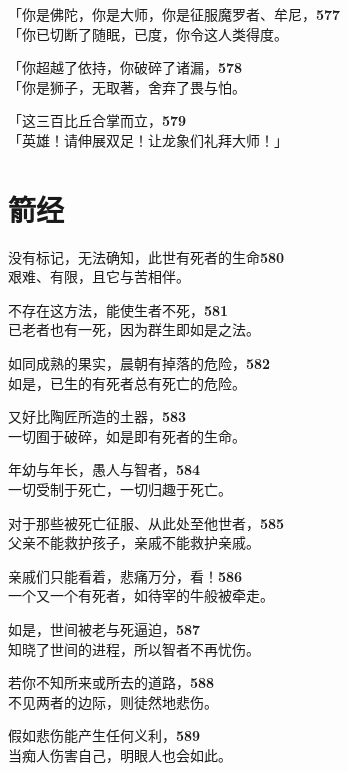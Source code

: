 「你是佛陀，你是大师，你是征服魔罗者、牟尼，\hfill{\grayfootnotesize \textbf{577}} \\
「你已切断了随眠，已度，你令这人类得度。


「你超越了依持，你破碎了诸漏，\hfill{\grayfootnotesize \textbf{578}} \\
「你是狮子，无取著，舍弃了畏与怕。

「这三百比丘合掌而立，\hfill{\grayfootnotesize \textbf{579}} \\
「英雄！请伸展双足！让龙象们礼拜大师！」

\section{箭经}

没有标记，无法确知，此世有死者的生命\hfill{\grayfootnotesize \textbf{580}} \\
艰难、有限，且它与苦相伴。


不存在这方法，能使生者不死，\hfill{\grayfootnotesize \textbf{581}} \\
已老者也有一死，因为群生即如是之法。


如同成熟的果实，晨朝有掉落的危险，\hfill{\grayfootnotesize \textbf{582}} \\
如是，已生的有死者总有死亡的危险。


又好比陶匠所造的土器，\hfill{\grayfootnotesize \textbf{583}} \\
一切囿于破碎，如是即有死者的生命。


年幼与年长，愚人与智者，\hfill{\grayfootnotesize \textbf{584}} \\
一切受制于死亡，一切归趣于死亡。


对于那些被死亡征服、从此处至他世者，\hfill{\grayfootnotesize \textbf{585}} \\
父亲不能救护孩子，亲戚不能救护亲戚。


亲戚们只能看着，悲痛万分，看！\hfill{\grayfootnotesize \textbf{586}} \\
一个又一个有死者，如待宰的牛般被牵走。


如是，世间被老与死逼迫，\hfill{\grayfootnotesize \textbf{587}} \\
知晓了世间的进程，所以智者不再忧伤。


若你不知所来或所去的道路，\hfill{\grayfootnotesize \textbf{588}} \\
不见两者的边际，则徒然地悲伤。


假如悲伤能产生任何义利，\hfill{\grayfootnotesize \textbf{589}} \\
当痴人伤害自己，明眼人也会如此。



